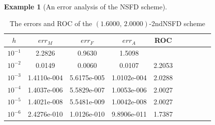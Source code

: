 \documentclass[12pt]{article}
\theoremstyle{definition}
\newtheorem{example}[theorem]{Example}
\theoremstyle{remark}
\numberwithin{equation}{section}
\begin{document}
\begin{example}[An error analysis of the NSFD scheme]
\begin{table}[H]
\begin{center}
\end{center}
\end{table}
\begin{table}[H]
\begin{center}
\caption{The errors and ROC of the $(1.6000,\,2.0000)$-2ndNSFD scheme}\label{Table3}
\begin{tabular}{cccccccccc}
\hline
$h$&$err_M$&$err_F$&$err_A$&ROC\\
\hline
$10^{-1}$&2.2826&0.9630&1.5098&\\
$10^{-2}$&0.0149&0.0060&0.0107&2.2053\\
$10^{-3}$&1.4110e-004&5.6175e-005&1.0102e-004&2.0288\\
$10^{-4}$&1.4037e-006&5.5829e-007&1.0053e-006&2.0027\\
$10^{-5}$&1.4021e-008&5.5481e-009&1.0042e-008& 2.0027\\
$10^{-6}$&2.4276e-010&1.0126e-010&9.8906e-011&1.7387\\
\hline
\end{tabular}
\end{center}
\end{table}


\end{example}
\end{document}

